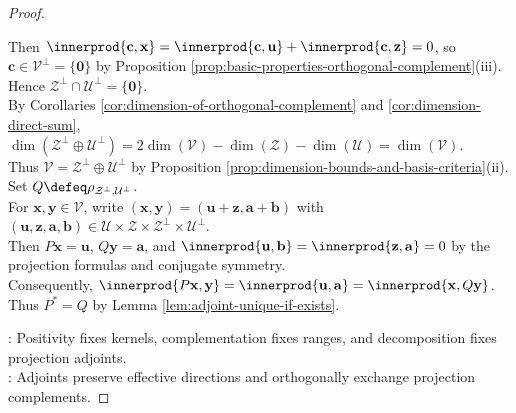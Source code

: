 \begin{proposition}
\begin{proof}
\begin{enumerate}[label=(\roman*)]
Then $\innerprod{\mathbf{c},\mathbf{x}}=\innerprod{\mathbf{c},\mathbf{u}}+\innerprod{\mathbf{c},\mathbf{z}}=0$, so $\mathbf{c}\in\mathcal{V}^{\perp}=\{\mathbf{0}\}$ by Proposition \ref{prop:basic-properties-orthogonal-complement}(iii).\\
Hence $\mathcal{Z}^{\perp}\cap\mathcal{U}^{\perp}=\{\mathbf{0}\}$.\\
By Corollaries \ref{cor:dimension-of-orthogonal-complement} and \ref{cor:dimension-direct-sum}, $\dim(\mathcal{Z}^{\perp}\oplus\mathcal{U}^{\perp})=2\dim(\mathcal{V})-\dim(\mathcal{Z})-\dim(\mathcal{U})=\dim(\mathcal{V})$.\\
Thus $\mathcal{V}=\mathcal{Z}^{\perp}\oplus\mathcal{U}^{\perp}$ by Proposition \ref{prop:dimension-bounds-and-basis-criteria}(ii).\\
Set $Q\defeq\rho_{\mathcal{Z}^{\perp},\mathcal{U}^{\perp}}$.\\
For $\mathbf{x},\mathbf{y}\in\mathcal{V}$, write $(\mathbf{x},\mathbf{y})=(\mathbf{u}+\mathbf{z},\mathbf{a}+\mathbf{b})$ with $(\mathbf{u},\mathbf{z},\mathbf{a},\mathbf{b})\in\mathcal{U}\times\mathcal{Z}\times\mathcal{Z}^{\perp}\times\mathcal{U}^{\perp}$.\\
Then $P\mathbf{x}=\mathbf{u}$, $Q\mathbf{y}=\mathbf{a}$, and $\innerprod{\mathbf{u},\mathbf{b}}=\innerprod{\mathbf{z},\mathbf{a}}=0$ by the projection formulas and conjugate symmetry.\\
Consequently, $\innerprod{P\mathbf{x},\mathbf{y}}=\innerprod{\mathbf{u},\mathbf{a}}=\innerprod{\mathbf{x},Q\mathbf{y}}$.\\
Thus $P^*=Q$ by Lemma \ref{lem:adjoint-unique-if-exists}.
\end{enumerate}
: Positivity fixes kernels, complementation fixes ranges, and decomposition fixes projection adjoints.\\
: Adjoints preserve effective directions and orthogonally exchange projection complements.
\end{proof}
\end{proposition}

